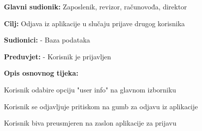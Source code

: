 					\noindent {}
						\begin{packed_item}
		
							\item \textbf{Glavni sudionik:} Zaposlenik, revizor, računovođa, direktor
							\item  \textbf{Cilj:} Odjava iz aplikacije u slučaju prijave drugog korisnika
							\item  \textbf{Sudionici:} - Baza podataka
							\item  \textbf{Preduvjet:} - Korisnik je prijavljen
							\item  \textbf{Opis osnovnog tijeka:}
							
							\item[] \begin{packed_enum}
								\item Korisnik odabire opciju "user info" na glavnom izborniku
								\item Korisnik se odjavljuje pritiskom na gumb za odjavu iz aplikacije
								\item Korisnik biva preusmjeren na zaslon aplikacije za prijavu
							\end{packed_enum}
						\end{packed_item}

